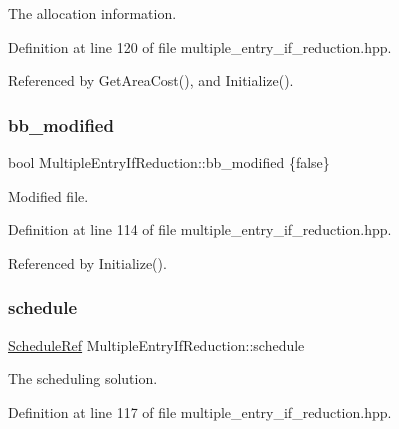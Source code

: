 The allocation information. 



Definition at line 120 of file multiple\+\_\+entry\+\_\+if\+\_\+reduction.\+hpp.



Referenced by Get\+Area\+Cost(), and Initialize().

\mbox{\label{classMultipleEntryIfReduction_abdf63137a4075f1ddfb9fd6897330930}} 
\subsubsection{\texorpdfstring{bb\+\_\+modified}{bb\_modified}}
{\footnotesize\ttfamily bool Multiple\+Entry\+If\+Reduction\+::bb\+\_\+modified \{false\}\hspace{0.3cm}{\ttfamily [private]}}



Modified file. 



Definition at line 114 of file multiple\+\_\+entry\+\_\+if\+\_\+reduction.\+hpp.



Referenced by Initialize().

\mbox{\label{classMultipleEntryIfReduction_a51863fa75a5407620503b3c0adaf9958}} 
\subsubsection{\texorpdfstring{schedule}{schedule}}
{\footnotesize\ttfamily \hyperlink{schedule_8hpp_af67f402958b3b52a1ec5cc4ce08ae3b9}{Schedule\+Ref} Multiple\+Entry\+If\+Reduction\+::schedule\hspace{0.3cm}{\ttfamily [private]}}



The scheduling solution. 



Definition at line 117 of file multiple\+\_\+entry\+\_\+if\+\_\+reduction.\+hpp.

